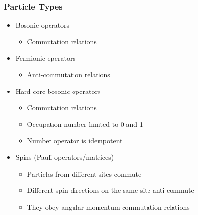     \begin{frame}[t]
        \frametitle{Particle Types}
        
        \vspace{-0.4cm}

        \begin{minipage}[t]{0.5\textwidth}
            \vspace{0pt}
            \begin{itemize}
                \item Bosonic operators
                \begin{itemize}
                    \item Commutation relations
                \end{itemize}
                \item Fermionic operators
                \begin{itemize}
                    \item Anti-commutation relations
                \end{itemize}
                \item Hard-core bosonic operators
                \begin{itemize}
                    \item Commutation relations
                    \item Occupation number limited to 0 and 1
                    \item Number operator is idempotent
                \end{itemize}
                \item Spins (Pauli operators/matrices)\pause
                \begin{itemize}
                    \item Particles from different sites commute
                    \item Different spin directions on the same site anti-commute
                    \item They obey angular momentum commutation relations
                \end{itemize}
            \end{itemize}
        \end{minipage}%
        \onslide
        \hfill
        \begin{minipage}[t]{0.45\textwidth}
            \vspace{-1.0cm}
\end{minipage}
\end{frame}
